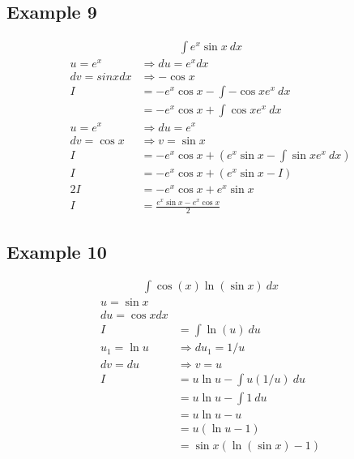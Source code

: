 \documentclass{article}
\theoremstyle{mytheoremstyle}
\theoremstyle{mytheoremstyle}
\theoremstyle{myproblemstyle}
\begin{document}
    \subsection*{Example 9}
    \begin{align*}
        \int e^x \sin x \ dx
    \end{align*}
    \begin{align*}
        u = e^x &\Rightarrow du = e^x dx \\
        dv = sinx dx &\Rightarrow -\cos x \\
        I &= -e^x\cos x - \int -\cos x e^x \ dx \\
        &= -e^x\cos x + \int \cos x e^x \ dx \\
        u = e^x &\Rightarrow du = e^x \\
        dv = \cos x &\Rightarrow v = \sin x \\
        I &= -e^x\cos x + (e^x \sin x - \int \sin x e^x \ dx) \\
        I &= -e^x\cos x + (e^x \sin x - I) \\
        2I &= -e^x\cos x + e^x \sin x \\
        I &= \frac{e^x \sin x - e^x\cos x}{2}
    \end{align*}

    \subsection*{Example 10}
    \begin{align*}
        \int \cos(x) \ln (\sin x) \ dx
    \end{align*}
    \begin{align*}
        u = \sin x \\
        du = \cos x dx \\
        I &= \int \ln(u) \ du \\
        u_1 = \ln u &\Rightarrow du_1 = 1/u \\
        dv = du &\Rightarrow v = u \\
        I &= u\ln u - \int u (1/u) \ du \\
        &= u\ln u - \int 1 \ du \\
        &= u\ln u - u \\
        &= u(\ln u - 1) \\
        &= \sin x(\ln(\sin x) - 1)
    \end{align*}
\end{document}
